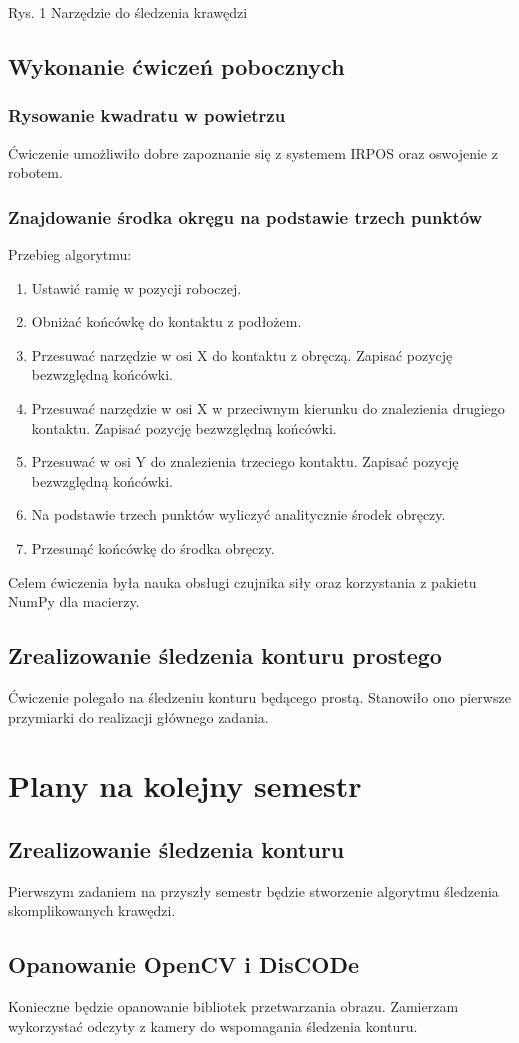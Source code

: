 \documentclass[12pt, a4paper, twoside]{book}
\begin{document}
	Rys. 1 Narzędzie do śledzenia krawędzi
	
	\section{Wykonanie ćwiczeń pobocznych}
		\subsection{Rysowanie kwadratu w powietrzu}
		Ćwiczenie umożliwiło dobre zapoznanie się z systemem IRPOS oraz oswojenie z robotem.
		\subsection{Znajdowanie środka okręgu na podstawie trzech punktów}
		Przebieg algorytmu:
			\begin{enumerate}
			\item Ustawić ramię w pozycji roboczej.
			\item Obniżać końcówkę do kontaktu z podłożem.
			\item Przesuwać narzędzie w osi X do kontaktu z obręczą. Zapisać pozycję bezwzględną końcówki.
			\item Przesuwać narzędzie w osi X w przeciwnym kierunku do znalezienia drugiego kontaktu. Zapisać pozycję bezwzględną końcówki.
			\item Przesuwać w osi Y do znalezienia trzeciego kontaktu. Zapisać pozycję bezwzględną końcówki.
			\item Na podstawie trzech punktów wyliczyć analitycznie środek obręczy.
			\item Przesunąć końcówkę do środka obręczy. 
			\end{enumerate}
		Celem ćwiczenia była nauka obsługi czujnika siły oraz korzystania z pakietu NumPy dla macierzy.
	\section{Zrealizowanie śledzenia konturu prostego}
		Ćwiczenie polegało na śledzeniu konturu będącego prostą. Stanowiło ono pierwsze przymiarki do realizacji głównego zadania.
			
\chapter{Plany na kolejny semestr}
	\section{Zrealizowanie śledzenia konturu}
	Pierwszym zadaniem na przyszły semestr będzie stworzenie algorytmu śledzenia skomplikowanych krawędzi.
	\section{Opanowanie OpenCV i DisCODe}
	Konieczne będzie opanowanie bibliotek przetwarzania obrazu. Zamierzam wykorzystać odczyty z kamery do wspomagania śledzenia konturu.
\end{document}

